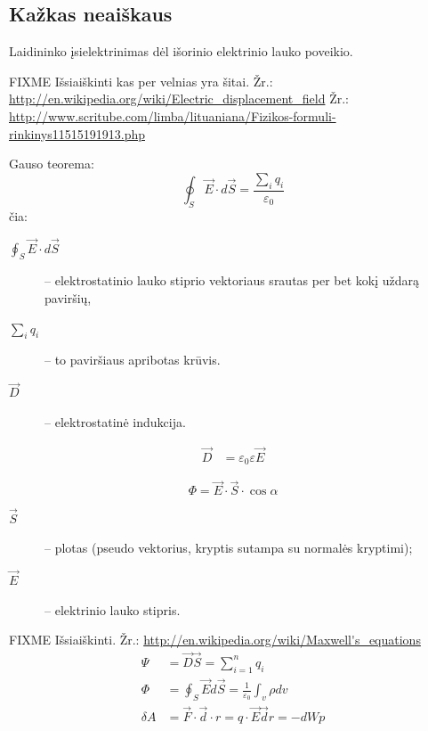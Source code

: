 \subsection{Kažkas neaiškaus}

\begin{defn}
  Laidininko įsielektrinimas dėl išorinio elektrinio lauko poveikio.
\end{defn}

FIXME Išsiaiškinti kas per velnias yra šitai.
Žr.: \url{http://en.wikipedia.org/wiki/Electric_displacement_field}
Žr.: \url{http://www.scritube.com/limba/lituaniana/Fizikos-formuli-rinkinys11515191913.php}

Gauso teorema:
\begin{equation*}
  \oint _{S} \vec{E} \cdot d \vec{S}
  = \frac{\sum_{i}q_{i}}{\varepsilon_{0}}
\end{equation*}
čia:
\begin{description}
  \item[$\oint_{S}\vec{E} \cdot d\vec{S}$] – elektrostatinio lauko stiprio
    vektoriaus srautas per bet kokį uždarą paviršių,
  \item[$\sum _{i} q_{i}$] – to paviršiaus apribotas krūvis.
\end{description}

\begin{description}
  \item[$\vec{D}$] – elektrostatinė indukcija.
\end{description}
\begin{align*}
  \vec{D} &= \varepsilon_{0} \varepsilon \vec{E}
\end{align*}

\begin{defn}
  \begin{equation}
    \Phi = \vec{E} \cdot \vec{S} \cdot \cos \alpha
    \label{def:srautas}
  \end{equation}
  \begin{description}
    \item[$\vec{S}$] – plotas (pseudo vektorius, kryptis sutampa su
      normalės kryptimi);
    \item[$\vec{E}$] – elektrinio lauko stipris.
  \end{description}
\end{defn}

FIXME Išsiaiškinti.
Žr.: \url{http://en.wikipedia.org/wiki/Maxwell's_equations}
\begin{align*}
  \Psi &= \vec{D} \vec{S} = \sum _{i=1} ^{n} q_{i} \\
  \Phi &= \oint_{S} \vec{E} d \vec{S} = 
    \frac{1}{\varepsilon_{0}} \int _{v} \rho dv \\
  \delta A &= \vec{F} \cdot \vec{d} \cdot r =
    q \cdot \vec{E} \vec{d} r = -d W p
\end{align*}

